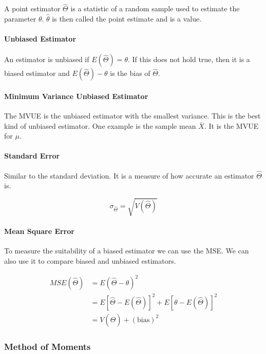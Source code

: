 \documentclass[12pt]{article}
\begin{document}
	A point estimator \(\hat{\Theta}\) is a statistic of a random sample used to estimate the parameter \(\theta\). \(\hat{\theta}\) is then called the point estimate and is a value.
	
	\paragraph{Unbiased Estimator}
	
	An estimator is unbiased if \(E(\hat{\Theta})=\theta\). If this does not hold true, then it is a biased estimator and \(E(\hat{\Theta})-\theta \) is the bias of \(\hat{\Theta}\).
	
	\paragraph{Minimum Variance Unbiased Estimator}
	
	The MVUE is the unbiased estimator with the smallest variance. This is the best kind of unbiased estimator. One example is the sample mean \(\bar{X}\). It is the MVUE for \(\mu\).
	
	\paragraph{Standard Error}
	
	Similar to the standard deviation. It is a measure of how accurate an estimator \(\hat{\Theta}\) is.
	
	\begin{equation*}
		\sigma_{\hat{\Theta}}=\sqrt{V(\hat{\Theta})}
	\end{equation*}
	
	\paragraph{Mean Square Error}
	
	To measure the suitability of a biased estimator we can use the MSE. We can also use it to compare biased and unbiased estimators.
	
	\begin{align*}
		MSE(\hat{\Theta}) &= E(\hat{\Theta} - \theta)^2 \\
		&= E\left[\hat{\Theta} - E(\hat{\Theta}) \right] ^2 + E\left[\theta - E(\hat{\Theta}) \right] ^2 \\
		&= V(\hat{\Theta}) + (\mathrm{bias})^2
	\end{align*}
	
	\subsubsection{Method of Moments}
	
\end{document}
